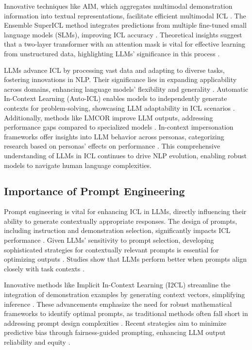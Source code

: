 Innovative techniques like AIM, which aggregates multimodal demonstration information into textual representations, facilitate efficient multimodal ICL \cite{gao2024aimletmultimodallarge}. The Ensemble SuperICL method integrates predictions from multiple fine-tuned small language models (SLMs), improving ICL accuracy \cite{duan2023exploring}. Theoretical insights suggest that a two-layer transformer with an attention mask is vital for effective learning from unstructured data, highlighting LLMs' significance in this process \cite{zhang2024impactdemonstrationsmultilingualincontext}.

LLMs advance ICL by processing vast data and adapting to diverse tasks, fostering innovations in NLP. Their significance lies in expanding applicability across domains, enhancing language models' flexibility and generality \cite{liu2023context}. Automatic In-Context Learning (Auto-ICL) enables models to independently generate contexts for problem-solving, showcasing LLM adaptability in ICL scenarios \cite{duan2023exploring}. Additionally, methods like LMCOR improve LLM outputs, addressing performance gaps compared to specialized models \cite{vernikos2024smalllanguagemodelsimprove}. In-context impersonation frameworks offer insights into LLM behavior across personas, categorizing research based on personas' effects on performance \cite{salewski2024context}. This comprehensive understanding of LLMs in ICL continues to drive NLP evolution, enabling robust models to navigate human language complexities.

\subsection{Importance of Prompt Engineering} \label{subsec:Importance of Prompt Engineering}

Prompt engineering is vital for enhancing ICL in LLMs, directly influencing their ability to generate contextually appropriate responses. The design of prompts, including instruction and demonstration selection, significantly impacts ICL performance \cite{ajith2023instructevalsystematicevaluationinstruction}. Given LLMs' sensitivity to prompt selection, developing sophisticated strategies for contextually relevant prompts is essential for optimizing outputs \cite{gao2023ambiguity}. Studies show that LLMs perform better when prompts align closely with task contexts \cite{sia2023incontextlearningmaintainingcoherency}.

Innovative methods like Implicit In-Context Learning (I2CL) streamline the integration of demonstration examples by generating context vectors, simplifying inference \cite{li2024implicitincontextlearning}. These advancements emphasize the need for robust mathematical frameworks to identify optimal prompts, as traditional methods often fall short in addressing prompt design complexities \cite{shi2024promptspaceoptimizingfewshot}. Recent strategies aim to minimize predictive bias through fairness-guided prompting, enhancing LLM output reliability and equity \cite{ma2023fairnessguidedfewshotpromptinglarge}.

